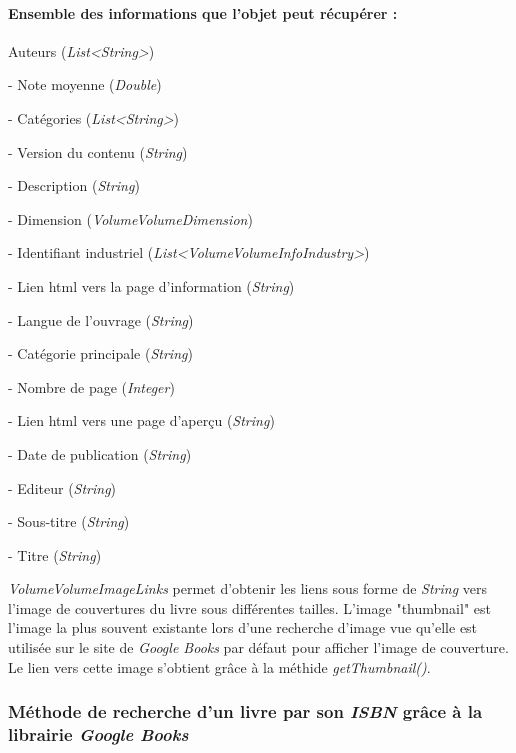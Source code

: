 \paragraph{Ensemble des informations que l'objet peut récupérer :}
\begin{description}
\item
Auteurs (\emph{List\textless String\textgreater})
\item
- Note moyenne (\emph{Double})
\item
- Catégories (\emph{List\textless String\textgreater})
\item
- Version du contenu (\emph{String})
\item
- Description (\emph{String})
\item
- Dimension (\emph{VolumeVolumeDimension})
\item
- Identifiant industriel (\emph{List\textless VolumeVolumeInfoIndustry\textgreater})
\item
- Lien html vers la page d'information (\emph{String})
\item
- Langue de l'ouvrage (\emph{String})
\item
- Catégorie principale (\emph{String})
\item
- Nombre de page (\emph{Integer})
\item
- Lien html vers une page d'aperçu (\emph{String})
\item
- Date de publication (\emph{String})
\item
- Editeur (\emph{String})
\item
- Sous-titre (\emph{String})
\item
- Titre (\emph{String})
\end{description}

\emph{VolumeVolumeImageLinks} permet d'obtenir les liens sous forme de \emph{String} vers l'image de couvertures du livre sous différentes tailles. 
L'image "thumbnail" est l'image la plus souvent existante lors d'une recherche d'image vue qu'elle est utilisée sur le site de \emph{Google Books} par défaut pour afficher l'image de couverture.
Le lien vers cette image s'obtient grâce à la méthide \emph{getThumbnail()}.

\subsubsection{Méthode de recherche d'un livre par son \emph{ISBN} grâce à la librairie \emph{Google Books}}

